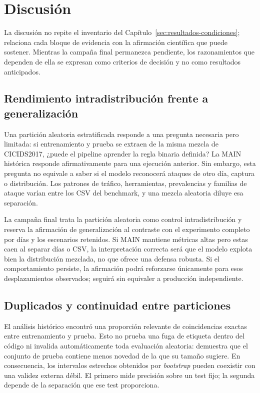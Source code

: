 \chapter{Discusión}

La discusión no repite el inventario del Capítulo~\ref{sec:resultados-condiciones}; relaciona cada bloque de evidencia con la afirmación científica que puede sostener. Mientras la campaña final permanezca pendiente, los razonamientos que dependen de ella se expresan como criterios de decisión y no como resultados anticipados.

\section{Rendimiento intradistribución frente a generalización}

Una partición aleatoria estratificada responde a una pregunta necesaria pero limitada: si entrenamiento y prueba se extraen de la misma mezcla de CICIDS2017, ¿puede el pipeline aprender la regla binaria definida? La MAIN histórica responde afirmativamente para una ejecución anterior. Sin embargo, esta pregunta no equivale a saber si el modelo reconocerá ataques de otro día, captura o distribución. Los patrones de tráfico, herramientas, prevalencias y familias de ataque varían entre los CSV del benchmark, y una mezcla aleatoria diluye esa separación.

La campaña final trata la partición aleatoria como control intradistribución y reserva la afirmación de generalización al contraste con el experimento completo por días y los escenarios retenidos. Si MAIN mantiene métricas altas pero estas caen al separar días o CSV, la interpretación correcta será que el modelo explota bien la distribución mezclada, no que ofrece una defensa robusta. Si el comportamiento persiste, la afirmación podrá reforzarse únicamente para esos desplazamientos observados; seguirá sin equivaler a producción independiente.

\section{Duplicados y continuidad entre particiones}

El análisis histórico encontró una proporción relevante de coincidencias exactas entre entrenamiento y prueba. Esto no prueba una fuga de etiqueta dentro del código ni invalida automáticamente toda evaluación aleatoria: demuestra que el conjunto de prueba contiene menos novedad de la que su tamaño sugiere. En consecuencia, los intervalos estrechos obtenidos por \emph{bootstrap} pueden coexistir con una validez externa débil. El primero mide precisión sobre un test fijo; la segunda depende de la separación que ese test proporciona.

